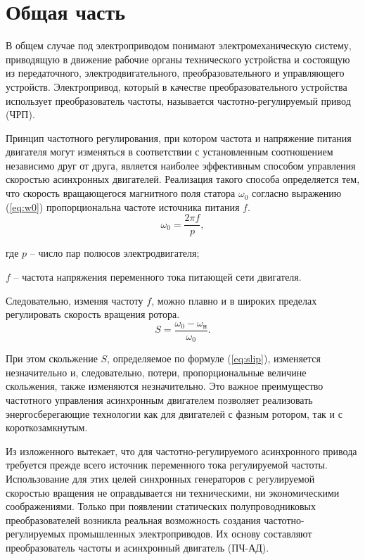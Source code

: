 \section{Общая часть}
        В общем случае под электроприводом понимают электромеханическую
        систему, приводящую в движение рабочие органы технического устройства и
        состоящую из передаточного, электродвигательного, преобразовательного и
        управляющего устройств. Электропривод, который в качестве
        преобразовательного устройства использует преобразователь частоты,
        называется частотно-регулируемый привод (ЧРП). 

        Принцип частотного регулирования, при котором частота и напряжение
        питания двигателя могут изменяться в соответствии с установленным
        соотношением независимо друг от друга, является наиболее эффективным
        способом управления скоростью асинхронных двигателей. Реализация такого
        способа определяется тем, что скорость вращающегося магнитного поля
        статора $\omega_0$ согласно выражению (\ref{eq:w0}) пропорциональна
        частоте источника питания $f$.
        \begin{equation}
            \label{eq:w0}
            \omega_0 = \frac{2\pi f}{p},
        \end{equation}

        где $p$ -- число пар полюсов электродвигателя;

        $f$ -- частота напряжения переменного тока питающей сети двигателя.
        
        Следовательно, изменяя частоту $f$,
        можно плавно и в широких пределах регулировать скорость вращения
        ротора.
        \begin{equation}
            \label{eq:slip}
            S = \frac{\omega_0 - \omega_\text{н}}{\omega_0}.
        \end{equation}
        
        При этом скольжение $S$, определяемое по формуле (\ref{eq:slip}),
        изменяется незначительно и, следовательно, потери, пропорциональные
        величине скольжения, также изменяются незначительно. Это важное
        преимущество частотного управления асинхронным двигателем позволяет
        реализовать энергосберегающие технологии как для двигателей с фазным
        ротором, так и с короткозамкнутым.

        Из изложенного вытекает, что для частотно-регулируемого асинхронного
        привода требуется прежде всего источник переменного тока регулируемой
        частоты. Использование для этих целей синхронных генераторов с
        регулируемой скоростью вращения не оправдывается ни техническими, ни
        экономическими соображениями. Только при появлении статических
        полупроводниковых преобразователей возникла реальная возможность
        создания частотно-регулируемых промышленных электроприводов. Их основу
        составляют преобразователь частоты и асинхронный двигатель (ПЧ-АД).
        
